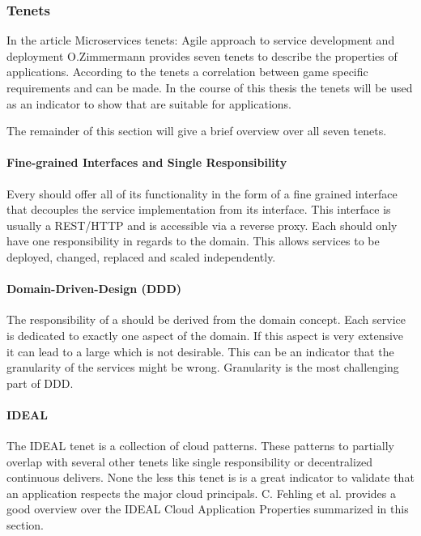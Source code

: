 \subsubsection{\ms{} Tenets}

In the article Microservices tenets: Agile approach to service development and
deployment O.Zimmermann provides seven \ms{} tenets to describe the properties
of \ms{} applications. According to the tenets a correlation between game
specific requirements and \ogs{} can be made. In the course of this thesis the
\ms{} tenets will be used as an indicator to show that \mss{} are suitable for
\og{} applications.

The remainder of this section will give a brief overview over all seven tenets.

\paragraph{Fine-grained Interfaces and Single Responsibility}

Every \ms{} should offer all of its functionality in the form of a fine grained
interface that decouples the service implementation from its interface. This
interface is usually a REST/HTTP and is accessible via a reverse proxy. Each
\ms{} should only have one responsibility in regards to the domain. This allows
services to be deployed, changed, replaced and scaled independently.

\paragraph{Domain-Driven-Design (DDD)}

The responsibility of a \ms{} should be derived from the domain concept. Each
service is dedicated to exactly one aspect of the domain. If this aspect is very
extensive it can lead to a large \ms{} which is not desirable. This can be an
indicator that the granularity of the services might be wrong. Granularity is
the most challenging part of DDD\cite{millett2015patterns}.

\paragraph{IDEAL}

The IDEAL tenet is a collection of cloud patterns. These patterns to partially
overlap with several other tenets like single responsibility or decentralized
continuous delivers. None the less this tenet is is a great indicator to
validate that an application respects the major cloud principals. C. Fehling et
al. provides a good overview over the  IDEAL Cloud Application Properties
summarized in this section\cite{fehling2015cloud}.

